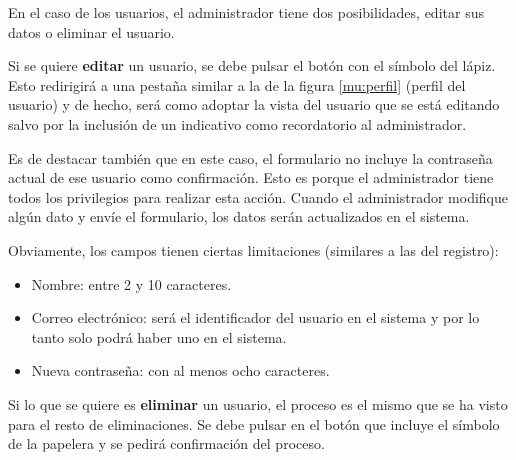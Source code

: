 En el caso de los usuarios, el administrador tiene dos posibilidades, editar sus
datos o eliminar el usuario.

Si se quiere \textbf{editar} un usuario, se debe pulsar el botón con el símbolo
del lápiz. Esto redirigirá a una pestaña similar a la de la figura
\ref{mu:perfil} (perfil del usuario) y de hecho, será como adoptar la vista del
usuario que se está editando salvo por la inclusión de un indicativo como
recordatorio al administrador.


Es de destacar también que en este caso, el formulario no incluye la contraseña
actual de ese usuario como confirmación. Esto es porque el administrador tiene
todos los privilegios para realizar esta acción. Cuando el administrador
modifique algún dato y envíe el formulario, los datos serán actualizados en el
sistema. 

Obviamente, los campos tienen ciertas limitaciones (similares a las del
registro):
\begin{itemize}
    \item Nombre: entre 2 y 10 caracteres.
    \item Correo electrónico: será el identificador del usuario en el sistema y
    por lo tanto solo podrá haber uno en el sistema.
    \item Nueva contraseña: con al menos ocho caracteres.
\end{itemize}

Si lo que se quiere es \textbf{eliminar} un usuario, el proceso es el mismo que
se ha visto para el resto de eliminaciones. Se debe pulsar en el botón que
incluye el símbolo de la papelera y se pedirá confirmación del proceso.

